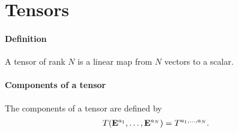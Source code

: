 \section{Tensors}

\paragraph{Definition}
A tensor of rank $N$ is a linear map from $N$ vectors to a scalar.

\paragraph{Components of a tensor}
The components of a tensor are defined by
\begin{align*}
	T(\vb{E}^{a_{1}}, \dots, \vb{E}^{a_{N}}) = T^{a_{1}, \dots, a_{N}}.
\end{align*}